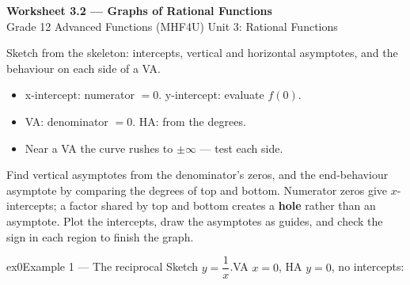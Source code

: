 \documentclass[11pt]{article}
\begin{document}
\begin{center}
{\LARGE\bfseries\color{titleblue}Worksheet 3.2 --- Graphs of Rational Functions}\\[2pt]
{\small Grade 12 Advanced Functions (MHF4U) \textperiodcentered{} Unit 3: Rational Functions}
\end{center}

\begin{ideabox}
Sketch from the skeleton: intercepts, vertical and horizontal asymptotes, and the behaviour on each side of a VA.
\begin{itemize}[leftmargin=*,itemsep=2pt]
  \item x-intercept: numerator $=0$. y-intercept: evaluate $f(0)$.
  \item VA: denominator $=0$. HA: from the degrees.
  \item Near a VA the curve rushes to $\pm\infty$ — test each side.
\end{itemize}
\end{ideabox}

\begin{learnbox}
Find vertical asymptotes from the denominator's zeros, and the end-behaviour asymptote by comparing the degrees of top and bottom.
Numerator zeros give $x$-intercepts; a factor shared by top and bottom creates a \textbf{hole} rather than an asymptote.
Plot the intercepts, draw the asymptotes as guides, and check the sign in each region to finish the graph.
\end{learnbox}


\begin{example}{ex0}{Example 1 --- The reciprocal}
Sketch $y=\dfrac1x$.\soln VA $x=0$, HA $y=0$, no intercepts:\begin{center}\end{center}
\end{example}
\end{document}
